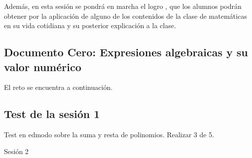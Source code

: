 Además, en esta sesión se pondrá en marcha el logro , que los alumnos podrán obtener por la aplicación de alguno de los contenidos de la clase de matemáticas en su vida cotidiana y su posterior explicación a la clase.

\ifinapp
\else
	\subsection{Documento Cero: Expresiones algebraicas y su valor numérico}
	\label{app:DocModel}
	El reto se encuentra a continuación.
	
\fi


\subsection{Test de la sesión 1}
\label{test:ses1}

\newbloq Test en edmodo sobre la suma y resta de polinomios. Realizar 3 de 5.









\newcommand{\numpreg}


\section{Sesión 2}



